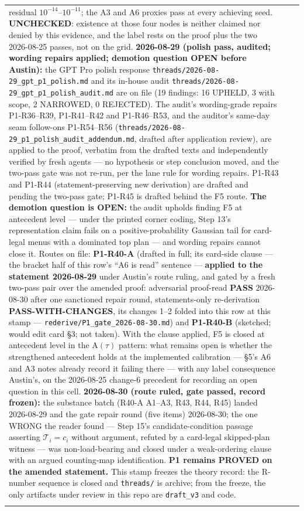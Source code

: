 \documentclass[11pt,a4paper]{article}
\newcommand{\Tmap}{\mathcal{T}}
\newcommand{\Atau}{\mathrm{A}(\tau)}
\begin{document}
\begin{longtable}{@{}p{}>{\raggedright\arraybackslash}p{}>{\raggedright\arraybackslash}p{}@{}}
residual $10^{-14}$--$10^{-11}$; the A3 and A6 proxies pass at every achieving seed.
\textbf{UNCHECKED}: existence at those four nodes is neither claimed nor denied by this
evidence, and the label rests on the proof plus the two 2026-08-25 passes, not on the
grid. \textbf{2026-08-29 (polish pass, audited; wording repairs applied; demotion question
OPEN before Austin):} the GPT Pro polish response
\texttt{threads/2026-08-29\_gpt\_p1\_polish.md} and its in-house audit
\texttt{threads/2026-08-29\_gpt\_p1\_polish\_audit.md} are on file (19 findings: 16 UPHELD,
3 with scope, 2 NARROWED, 0 REJECTED). The audit's wording-grade repairs P1-R36--R39,
P1-R41--R42 and P1-R46--R53, and the auditor's same-day seam follow-ons P1-R54--R56
(\texttt{threads/2026-08-29\_p1\_polish\_audit\_addendum.md}, drafted after application
review), are applied to the proof, verbatim from the drafted texts and
independently verified by fresh agents --- no hypothesis or step conclusion moved, and the
two-pass gate was not re-run, per the lane rule for wording repairs. P1-R43 and P1-R44
(statement-preserving new derivation) are drafted and pending the two-pass gate; P1-R45 is
drafted behind the F5 route. \textbf{The demotion question is OPEN:} the audit upholds
finding F5 at antecedent level --- under the printed corner coding, Step 13's representation
claim fails on a positive-probability Gaussian tail for card-legal menus with a dominated
top plan --- and wording repairs cannot close it. Routes on file: \textbf{P1-R40-A} (drafted
in full; its card-side clause --- the bracket half of this row's ``A6 is read'' sentence ---
\textbf{applied to the statement 2026-08-29} under Austin's route ruling, and gated by a
fresh two-pass pair over the amended proof: adversarial proof-read \textbf{PASS} 2026-08-30
after one sanctioned repair round, statements-only re-derivation
\textbf{PASS-WITH-CHANGES}, its changes 1--2 folded into this row at this stamp ---
\texttt{rederive/P1\_gate\_2026-08-30.md}) and \textbf{P1-R40-B} (sketched; would edit card
\S3; not taken). With the clause applied, F5 is closed at antecedent level in the $\Atau$
pattern: what remains open is whether the strengthened antecedent holds at the implemented
calibration --- \S5's A6 and A3 notes already record it failing there --- with any label
consequence Austin's, on the 2026-08-25 change-6 precedent for recording an open question in
this cell. \textbf{2026-08-30 (route ruled, gate passed, record frozen):} the substance
batch (R40-A A1--A3, R43, R44, R45) landed 2026-08-29 and the gate repair round (five
items) 2026-08-30; the one WRONG the reader found --- Step 15's candidate-condition passage
asserting $\Tmap_i=c_i$ without argument, refuted by a card-legal skipped-plan witness ---
was non-load-bearing and closed under a weak-ordering clause with an argued counting-map
identification. \textbf{P1 remains PROVED on the amended statement.} This stamp freezes the
theory record: the R-number sequence is closed and \texttt{threads/} is archive; from the
freeze, the only artifacts under review in this repo are \texttt{draft\_v3} and code. &
\\
\addlinespace


\end{longtable}
\end{document}
